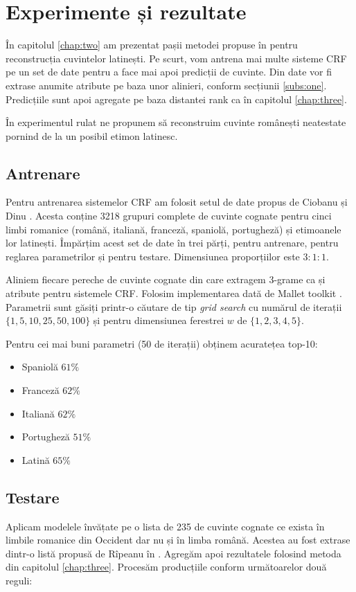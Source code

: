 \chapter{Experimente și rezultate}
În capitolul \ref{chap:two} am prezentat pașii metodei propuse în \cite{sub}
pentru reconstrucția cuvintelor
latinești. Pe scurt, vom antrena mai multe sisteme CRF pe un set de date pentru a face mai apoi 
predicții de cuvinte. Din date vor fi extrase anumite atribute pe baza unor alinieri, conform 
secțiunii \ref{subs:one}. Predicțiile sunt apoi agregate pe baza distantei rank ca în capitolul
\ref{chap:three}.

În experimentul rulat ne propunem să reconstruim cuvinte românești neatestate pornind de la un posibil
etimon latinesc.  

\section{Antrenare}
Pentru antrenarea sistemelor CRF am folosit setul de date propus de Ciobanu și Dinu \cite{dataset}.
Acesta conține 3218 grupuri complete de cuvinte cognate pentru cinci limbi romanice (română, italiană, 
franceză, spaniolă, portugheză) și etimoanele lor latinești. Împărțim acest set de date în trei părți,
pentru antrenare, pentru reglarea parametrilor și pentru testare. Dimensiunea proporțiilor este $3:1:1$.

Aliniem fiecare pereche de cuvinte cognate din care extragem 3-grame ca și atribute pentru sistemele CRF.
Folosim implementarea dată de Mallet toolkit \cite{mallet}. Parametrii sunt găsiți printr-o căutare
de tip \textit{grid search} cu numărul de iterații $\{1, 5, 10, 25, 50, 100\}$ și pentru dimensiunea
ferestrei $w$ de $\{1, 2, 3, 4, 5\}$.

Pentru cei mai buni parametri (50 de iterații) obținem acuratețea top-10:
\begin{itemize}
    \item Spaniolă   $61\%$
    \item Franceză   $62\%$
    \item Italiană   $62\%$
    \item Portugheză $51\%$
    \item Latină     $65\%$
\end{itemize}

\section{Testare}
Aplicam modelele învățate pe o lista de 235 de cuvinte cognate ce exista în limbile romanice din 
Occident dar nu și în limba română. Acestea au fost extrase dintr-o listă propusă de Rîpeanu în \cite{ripeanubook}.
Agregăm apoi rezultatele folosind metoda din capitolul \ref{chap:three}. Procesăm producțiile conform 
următoarelor două reguli:

